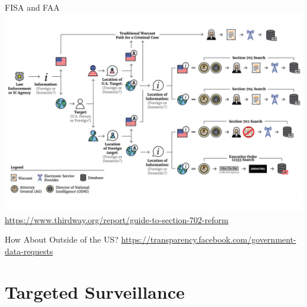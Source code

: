 \documentclass[nobackground,dvipsnames,table,aspectratio=169]{beamer}
\begin{document}
\begin{frame}{FISA and FAA}
    \includegraphics[width=\textwidth]{section-702-flowchart}
    \tiny
    \url{https://www.thirdway.org/report/guide-to-section-702-reform}
\end{frame}

\begin{frame}{How About Outside of the US?}
    \tiny
    \url{https://transparency.facebook.com/government-data-requests}
\end{frame}

\section{Targeted Surveillance}
\end{document}
